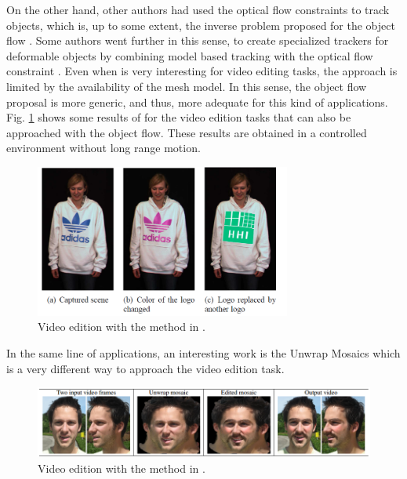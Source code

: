 On the other hand, other authors had used the optical flow constraints to track objects, 
which is, up to some extent, the inverse problem proposed for the object flow \cite{c37}. Some authors went further in this sense, to create specialized trackers 
for deformable objects by combining model based tracking with the optical flow constraint \cite{c38}. Even when \cite{c38} is very interesting for video editing 
tasks, the approach is limited by the availability of the mesh model. In this sense, the object flow proposal is more generic, and thus, more adequate for this kind 
of applications. Fig. \ref{soa1} shows some results of \cite{c38} for the video edition tasks that can also be approached with the object flow. These results are obtained in 
a controlled environment without long range motion.

   \begin{figure}[thpb]
      \centering
      \includegraphics[width=0.75\textwidth]{../images/soa_app.png}
      \caption{  Video edition with the method in  \cite{c38}. }
      \label{soa1}
   \end{figure}

In the same line of applications, an interesting work is the Unwrap Mosaics \cite{c41} which is a very different way to approach the video edition task. 

   \begin{figure}[thpb]
      \centering
      \includegraphics[width=1.00\textwidth]{../images/soa_app2.png}
      \caption{  Video edition with the method in  \cite{c41}. }
      \label{soa2}
   \end{figure}

